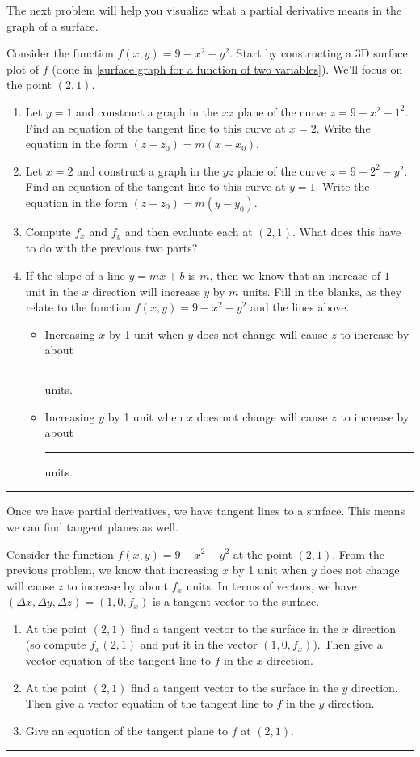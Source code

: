 The next problem will help you visualize what a partial derivative means in the graph of a surface.
\begin{problem} \label{cake introduction}
 Consider the function $f(x,y)=9-x^2-y^2$.  Start by constructing a 3D surface plot of $f$ (done in \ref{surface graph for a function of two variables}). We'll focus on the point $(2,1)$.
\begin{enumerate}
 \item Let $y=1$ and construct a graph in the $xz$ plane of the curve $z=9-x^2-1^2$. Find an equation of the tangent line to this curve at $x=2$. Write the equation in the form $(z-z_0)=m(x-x_0)$.
 \item Let $x=2$ and construct a graph in the $yz$ plane of the curve $z=9-2^2-y^2$. Find an equation of the tangent line to this curve at $y=1$. Write the equation in the form $(z-z_0)=m(y-y_0)$.
 \item Compute $f_x$ and $f_y$ and then evaluate each at $(2,1)$.  What does this have to do with the previous two parts?
 \item If the slope of a line $y=mx+b$ is $m$, then we know that an increase of $1$ unit in the $x$ direction will increase $y$ by $m$ units. Fill in the blanks, as they relate to the function $f(x,y)=9-x^2-y^2$ and the lines above.
\begin{itemize}
 \item Increasing $x$ by 1 unit when $y$ does not change will cause $z$ to increase by about \rule{1cm}{1pt} units.
 \item Increasing $y$ by 1 unit when $x$ does not change will cause $z$ to increase by about \rule{1cm}{1pt} units.
\end{itemize}
\end{enumerate}
\hrule\end{problem}

Once we have partial derivatives, we have tangent lines to a surface. This means we can find tangent planes as well.
\begin{problem} \label{cake plane introduction}%
 Consider the function $f(x,y)=9-x^2-y^2$ at the point $(2,1)$. From the previous problem, we know that increasing $x$ by 1 unit when $y$ does not change will cause $z$ to increase by about $f_x$ units. In terms of vectors, we have $(\Delta x, \Delta y, \Delta z) = (1,0,f_x)$ is a tangent vector to the surface. 
\begin{enumerate}
 \item At the point $(2,1)$ find a tangent vector to the surface in the $x$ direction (so compute $f_x(2,1)$ and put it in the vector $(1,0,f_x)$). Then give a vector equation of the tangent line to $f$ in the $x$ direction.
 \item At the point $(2,1)$ find a tangent vector to the surface in the $y$ direction. 
Then give a vector equation of the tangent line to $f$ in the $y$ direction.
 \item Give an equation of the tangent plane to $f$ at $(2,1)$. 
\end{enumerate}
\hrule\end{problem}

